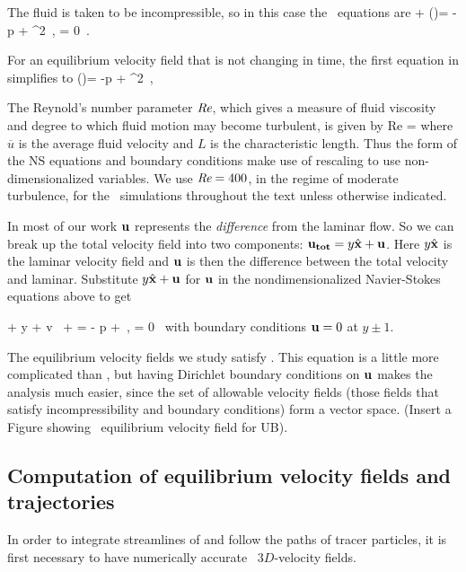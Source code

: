 \documentclass[letter,10pt,openany]{article}
\begin{document}
 The fluid is taken to be incompressible, so in this case the
 \NS\ equations are
 \beq
  + (\bu \cdot \nabla)\bu = -\nabla p +  \nabla^{2} \bu
    \,,\qquad
\nabla \cdot \bu  = 0 \,. \label{eqn:NavierStokes} \eeq 



For an equilibrium velocity field that is not changing in time, the first equation in
 simplifies to \beq
 (\bu \cdot \nabla)\bu = -\nabla p +  \nabla^{2} \bu
    \,,\qquad \label{eqn:NavierStokes2} \eeq
 
  The Reynold's number parameter $\textit{Re}$, which gives a measure of fluid viscosity and degree to which fluid motion may become turbulent, is given by \beq Re = 
\eeq where $\overline{u}$ is the average fluid velocity and $L$ is
the characteristic length. Thus the form of the NS equations and boundary conditions make use of rescaling to use non-dimensionalized variables. 
We use $\textit{Re} = 400$, in the regime of moderate turbulence, for the \pCf\ simulations throughout the text unless otherwise indicated.

In most of our work  ${\bf u}$
represents the {\em difference} from the laminar flow. 
So we can break up the total velocity field into two components: ${\bf u_{tot}} =
y \hat{\bf x} + {\bf u}$. Here $y \hat{\bf x}$ is the laminar velocity
field and ${\bf u}$ is then the difference between the total velocity and
laminar. Substitute $y \hat{\bf x} + {\bf u}$ for ${\bf u}$ in the
nondimensionalized Navier-Stokes equations above to get

\beq
    + y  
    + v \, 
    + \bu \cdot \bnabla \bu
=
    - \bnabla p
    + 
        \lapl \bu  \,, \quad \nabla \cdot \bu = 0
\, \label{NavStokesDiff}
\eeq
with boundary conditions ${\bf u} = 0 $ at $y \pm 1$.

The equilibrium velocity fields we study satisfy . This equation is a little more complicated than
, but having Dirichlet boundary conditions on
${\bf u}$ makes the analysis much easier, since the set of allowable velocity fields (those fields that satisfy incompressibility and boundary
conditions)
form a vector space. (Insert a Figure showing \pCf\ equilibrium velocity field for UB).






\subsection {\bf Computation of equilibrium velocity fields and trajectories}
\label{channelflow}
 In order to integrate streamlines of {\pCf}
and follow the paths of tracer particles, it is first
necessary to have numerically accurate \eqv\ $3D$-velocity fields.
\end{document}
